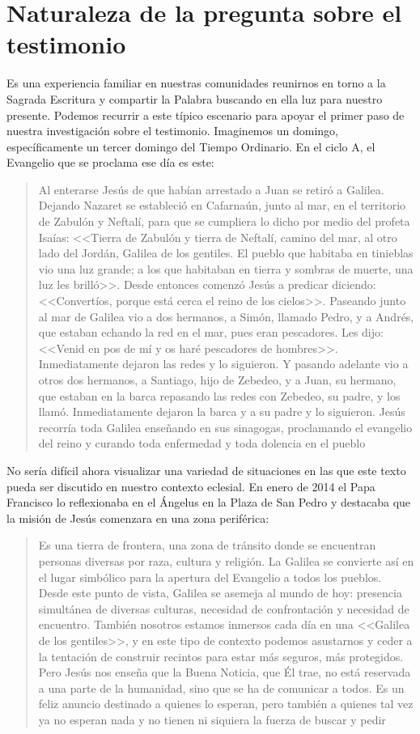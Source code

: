 \section{Naturaleza de la pregunta sobre el testimonio}

Es una experiencia familiar en nuestras comunidades reunirnos en torno a la Sagrada Escritura y compartir la Palabra buscando en ella luz para nuestro presente. Podemos recurrir a este típico escenario para apoyar el primer paso de nuestra investigación sobre el testimonio. Imaginemos un domingo, específicamente un tercer domingo del Tiempo Ordinario. En el ciclo A, el Evangelio que se proclama ese día es este:
\blockquote[][\,(Mt~4,12-23)]{Al enterarse Jesús de que habían arrestado a Juan se retiró a Galilea. Dejando Nazaret se estableció en Cafarnaún, junto al mar, en el territorio de Zabulón y Neftalí, para que se cumpliera lo dicho por medio del profeta Isaías: <<Tierra de Zabulón y tierra de Neftalí, camino del mar, al otro lado del Jordán, Galilea de los gentiles. El pueblo que habitaba en tinieblas vio una luz grande; a los que habitaban en tierra y sombras de muerte, una luz les brilló>>. Desde entonces comenzó Jesús a predicar diciendo: <<Convertíos, porque está cerca el reino de los cielos>>. Paseando junto al mar de Galilea vio a dos hermanos, a Simón, llamado Pedro, y a Andrés, que estaban echando la red en el mar, pues eran pescadores. Les dijo: <<Venid en pos de mí y os haré pescadores de hombres>>. Inmediatamente dejaron las redes y lo siguieron. Y pasando adelante vio a otros dos hermanos, a Santiago, hijo de Zebedeo, y a Juan, su hermano, que estaban en la barca repasando las redes con Zebedeo, su padre, y los llamó. Inmediatamente dejaron la barca y a su padre y lo siguieron. Jesús recorría toda Galilea enseñando en sus sinagogas, proclamando el evangelio del reino y curando toda enfermedad y toda dolencia en el pueblo}.

No sería difícil ahora visualizar una variedad de situaciones en las que este texto pueda ser discutido en nuestro contexto eclesial. En enero de 2014 el Papa Francisco lo reflexionaba en el Ángelus en la Plaza de San Pedro y destacaba que la misión de Jesús comenzara en una zona periférica:
\blockquote[{\cite{francisco2014angelus}}]{Es una tierra de frontera, una zona de tránsito donde se encuentran personas diversas por raza, cultura y religión. La Galilea se convierte así en el lugar simbólico para la apertura del Evangelio a todos los pueblos. Desde este punto de vista, Galilea se asemeja al mundo de hoy: presencia simultánea de diversas culturas, necesidad de confrontación y necesidad de encuentro. También nosotros estamos inmersos cada día en una <<Galilea de los gentiles>>, y en este tipo de contexto podemos asustarnos y ceder a la tentación de construir recintos para estar más seguros, más protegidos. Pero Jesús nos enseña que la Buena Noticia, que Él trae, no está reservada a una parte de la humanidad, sino que se ha de comunicar a todos. Es un feliz anuncio destinado a quienes lo esperan, pero también a quienes tal vez ya no esperan nada y no tienen ni siquiera la fuerza de buscar y pedir}.

